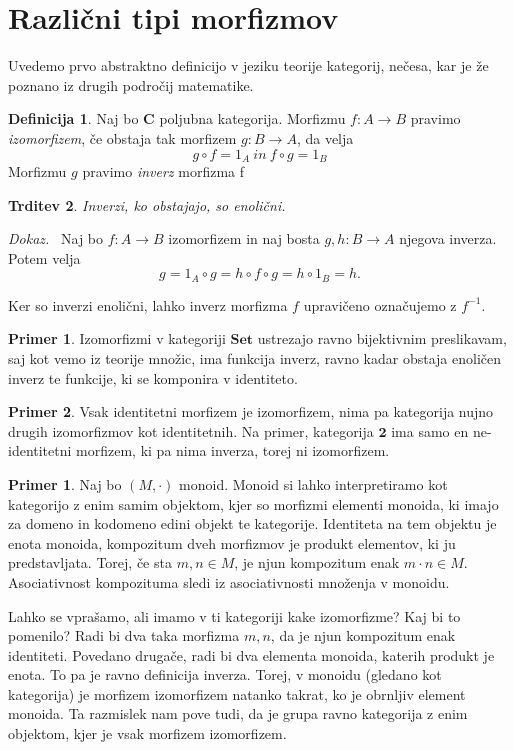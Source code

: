 \documentclass[12pt,a4paper]{book}
\theoremstyle{definition}
\newtheorem{definicija}{Definicija}[chapter]
\theoremstyle{plain}
\newtheorem{trditev}[definicija]{Trditev}
\newenvironment{dokaz}{\emph{Dokaz.}\ }{\hspace{\fill}{$\Box$}}
\theoremstyle{definition}
\newtheorem{primer}{Primer}[section]
\newtheorem*{primer*}{Primer}
\theoremstyle{remark}
\newcommand{\cat}[1]{\textbf{#1}}
\begin{document}
\section{Različni tipi morfizmov}
Uvedemo prvo abstraktno definicijo v jeziku teorije kategorij, nečesa, kar je že poznano iz drugih področij matematike.

\begin{definicija} Naj bo \cat{C} poljubna kategorija. Morfizmu $f : A \to B$ pravimo \emph{izomorfizem}, če obstaja tak morfizem $g : B \to A$, da velja
$$g \circ f = 1_A \ in \ f \circ g = 1_B$$
Morfizmu $g$ pravimo \emph{inverz} morfizma f
\end{definicija}

\begin{trditev} Inverzi, ko obstajajo, so enolični.
\end{trditev}
\begin{dokaz}
Naj bo $f : A \to B$ izomorfizem in naj bosta $g,h: B \to A$ njegova inverza. Potem velja 
$$g = 1_A \circ g = h \circ f \circ g = h \circ 1_B = h.$$
\end{dokaz}

Ker so inverzi enolični, lahko inverz morfizma $f$ upravičeno označujemo z $f^{-1}$.

\begin{primer*}
Izomorfizmi v kategoriji $\cat{Set}$ ustrezajo ravno bijektivnim preslikavam, saj kot vemo iz teorije množic, ima funkcija inverz, ravno kadar obstaja enoličen inverz te funkcije, ki se komponira v identiteto. 
\end{primer*}

\begin{primer*}
Vsak identitetni morfizem je izomorfizem, nima pa kategorija nujno drugih izomorfizmov kot identitetnih. Na primer, kategorija $\cat{2}$ ima samo en ne-identitetni morfizem, ki pa nima inverza, torej ni izomorfizem.
\end{primer*}

\begin{primer}
Naj bo $(M,\cdot)$ monoid. Monoid si lahko interpretiramo kot kategorijo z enim samim objektom, kjer so morfizmi elementi monoida, ki imajo za domeno in kodomeno edini objekt te kategorije. Identiteta na tem objektu je enota monoida, kompozitum dveh morfizmov je produkt elementov, ki ju predstavljata. Torej, če sta $m,n \in M$, je njun kompozitum enak $m \cdot n \in M$. Asociativnost kompozituma sledi iz asociativnosti množenja v monoidu.

Lahko se vprašamo, ali imamo v ti kategoriji kake izomorfizme? Kaj bi to pomenilo? Radi bi dva taka morfizma $m,n$, da je njun kompozitum enak identiteti. Povedano drugače, radi bi dva elementa monoida, katerih produkt je enota. To pa je ravno definicija inverza. Torej, v monoidu (gledano kot kategorija) je morfizem izomorfizem natanko takrat, ko je obrnljiv element monoida. Ta razmislek nam pove tudi, da je grupa ravno kategorija z enim objektom, kjer je vsak morfizem izomorfizem.
\end{primer}
\end{document}
